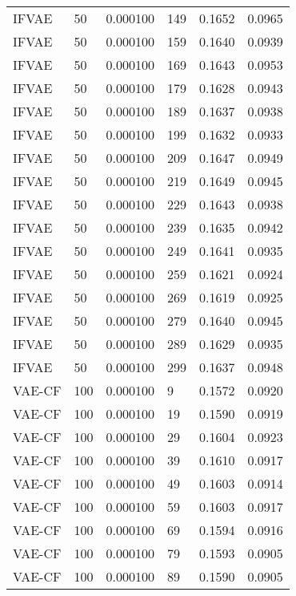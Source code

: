 \begin{tabular}{llrlrr}
   IFVAE &   50 &  0.000100 &   149 &  0.1652 &       0.0965 \\
   IFVAE &   50 &  0.000100 &   159 &  0.1640 &       0.0939 \\
   IFVAE &   50 &  0.000100 &   169 &  0.1643 &       0.0953 \\
   IFVAE &   50 &  0.000100 &   179 &  0.1628 &       0.0943 \\
   IFVAE &   50 &  0.000100 &   189 &  0.1637 &       0.0938 \\
   IFVAE &   50 &  0.000100 &   199 &  0.1632 &       0.0933 \\
   IFVAE &   50 &  0.000100 &   209 &  0.1647 &       0.0949 \\
   IFVAE &   50 &  0.000100 &   219 &  0.1649 &       0.0945 \\
   IFVAE &   50 &  0.000100 &   229 &  0.1643 &       0.0938 \\
   IFVAE &   50 &  0.000100 &   239 &  0.1635 &       0.0942 \\
   IFVAE &   50 &  0.000100 &   249 &  0.1641 &       0.0935 \\
   IFVAE &   50 &  0.000100 &   259 &  0.1621 &       0.0924 \\
   IFVAE &   50 &  0.000100 &   269 &  0.1619 &       0.0925 \\
   IFVAE &   50 &  0.000100 &   279 &  0.1640 &       0.0945 \\
   IFVAE &   50 &  0.000100 &   289 &  0.1629 &       0.0935 \\
   IFVAE &   50 &  0.000100 &   299 &  0.1637 &       0.0948 \\
  VAE-CF &  100 &  0.000100 &     9 &  0.1572 &       0.0920 \\
  VAE-CF &  100 &  0.000100 &    19 &  0.1590 &       0.0919 \\
  VAE-CF &  100 &  0.000100 &    29 &  0.1604 &       0.0923 \\
  VAE-CF &  100 &  0.000100 &    39 &  0.1610 &       0.0917 \\
  VAE-CF &  100 &  0.000100 &    49 &  0.1603 &       0.0914 \\
  VAE-CF &  100 &  0.000100 &    59 &  0.1603 &       0.0917 \\
  VAE-CF &  100 &  0.000100 &    69 &  0.1594 &       0.0916 \\
  VAE-CF &  100 &  0.000100 &    79 &  0.1593 &       0.0905 \\
  VAE-CF &  100 &  0.000100 &    89 &  0.1590 &       0.0905 \\

\end{tabular}
